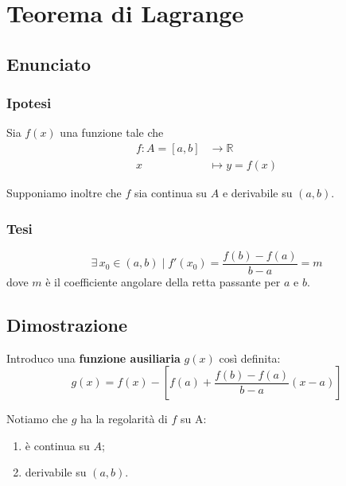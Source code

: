 \documentclass[../../dimostrazioni]{subfiles}
\begin{document}
    \chapter{Teorema di Lagrange}
    \label{teoLagrange}

        \section*{Enunciato}

            \subsection*{Ipotesi}

                Sia \(f(x)\) una funzione tale che
                \begin{align*}
                    f : A = [a, b] &\longrightarrow \mathbb{R}\\
                    x &\longmapsto y = f(x) 
                \end{align*}

                Supponiamo inoltre che \(f\) sia continua su \(A\) e derivabile su \((a, b)\).

            \subsection*{Tesi}

                \[ \exists \, x_0 \in (a,b) \; | \; f'(x_0) = \frac{f(b)-f(a)}{b-a}=m \]
                dove \(m\) è il coefficiente angolare della retta passante per \(a\) e \(b\).

        \section*{Dimostrazione}

            Introduco una \textbf{funzione ausiliaria} \(g(x)\) così definita:
            \[ g(x) = f(x) - \left[f(a) + \frac{f(b) - f(a)}{b - a}(x - a) \right] \]

            Notiamo che \(g\) ha la regolarità di \(f\) su A:
            \begin{enumerate}
                \indentitem \item è continua su \( A \);
                \indentitem \item derivabile su \( (a, b) \).
            \end{enumerate}
\end{document}

